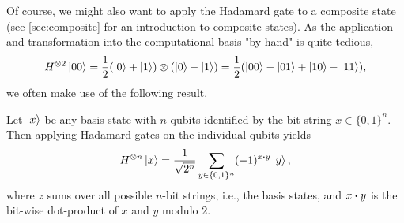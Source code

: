 				Of course, we might also want to apply the Hadamard gate to a composite state (see \autoref{sec:composite} for an introduction to composite states). As the application and transformation into the computational basis "by hand" is quite tedious,
				\begin{equation}
					H^{\otimes 2} \ket{00}
						= \frac{1}{2} (\ket{0} + \ket{1}) \otimes (\ket{0} - \ket{1})
						= \frac{1}{2} (\ket{00} - \ket{01} + \ket{10} - \ket{11}),
				\end{equation}
				we often make use of the following result.
				\begin{theorem}  \label{th:hadamardGate}
					Let \(\ket{x}\) be any basis state with \(n\) qubits identified by the bit string \( x \in \{ 0, 1 \}^n \). Then applying Hadamard gates on the individual qubits yields
					\begin{equation}
						H^{\otimes n} \ket{x} = \frac{1}{\sqrt{2^n}} \sum_{y \in \{ 0, 1 \}^n} (-1)^{x \dotproduct y} \ket{y},
					\end{equation}
					where \(z\) sums over all possible \(n\)-bit strings, i.e., the basis states, and \( x \dotproduct y \) is the bit-wise dot-product of \(x\) and \(y\) modulo \(2\).
				\end{theorem}
